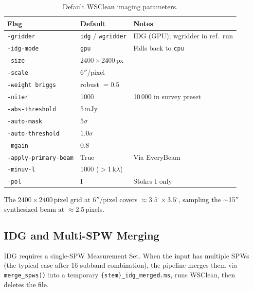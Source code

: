 \documentclass[12pt,a4paper]{article}
\newcommand{\code}[1]{\colorbox{codegray}{\texttt{\small #1}}}
\newcommand{\degr}{\ensuremath{^\circ}}
\begin{document}
\begin{table}[h!]
  \centering
  \caption{Default WSClean imaging parameters.}
  \label{tab:wsclean}
  \begin{tabular}{lll}
    \toprule
    \textbf{Flag} & \textbf{Default} & \textbf{Notes} \\
    \midrule
    \code{-gridder}            & \code{idg} / \code{wgridder}   & IDG (GPU); wgridder in ref.\ run \\
    \code{-idg-mode}           & \code{gpu}                     & Falls back to \code{cpu} \\
    \code{-size}               & $2400\times2400$\,px            & \\
    \code{-scale}              & $6''$/pixel                     & \\
    \code{-weight briggs}      & robust $= 0.5$                  & \\
    \code{-niter}              & 1000                            & 10\,000 in survey preset \\
    \code{-abs-threshold}      & 5\,mJy                          & \\
    \code{-auto-mask}          & $5\sigma$                       & \\
    \code{-auto-threshold}     & $1.0\sigma$                     & \\
    \code{-mgain}              & 0.8                             & \\
    \code{-apply-primary-beam} & True                            & Via EveryBeam \\
    \code{-minuv-l}            & 1000 ($>$1\,k$\lambda$)         & \\
    \code{-pol}                & I                               & Stokes I only \\
    \bottomrule
  \end{tabular}
\end{table}

The $2400 \times 2400$\,pixel grid at $6''$/pixel covers
$\approx 3.5\degr \times 3.5\degr$, sampling the $\sim$15$''$ synthesized
beam at $\approx$2.5\,pixels.

\subsection{IDG and Multi-SPW Merging}

IDG requires a single-SPW Measurement Set.  When the input has multiple
SPWs (the typical case after 16-subband combination), the pipeline merges
them via \texttt{merge\_spws()} into a temporary
\texttt{\{stem\}\_idg\_merged.ms}, runs WSClean, then deletes the file.
\end{document}
